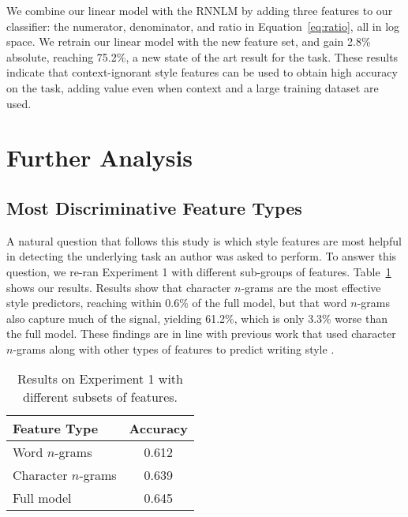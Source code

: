 \documentclass[11pt,a4paper]{article}
\newcommand{\tabref}[1]{Table~\ref{#1}}
\newcommand{\isection}[2]{\section{#1}\label{ssec:#2}}
\newcommand{\com}[1]{}
\newcommand{\resolved}[1]{}
\newcommand{\roy}[1]{{\color{orange}\textsc{[#1 --rs]}}}
\newcommand{\nascomment}[1]{{\color{blue}\textsc{[#1 --nas]}}}
\renewcommand{\roy}[1]{{\color{orange}[#1 --rs]}}
\renewcommand{\roy}[1]{#1}
\renewcommand{\nascomment}[1]{}
\begin{document}
We combine our linear model with the RNNLM by adding three features to
our classifier: the numerator, denominator, and ratio in
Equation~\ref{eq:ratio}, all in log space. %
We retrain our linear  model with the new feature set, and gain 2.8\%
absolute, reaching 75.2\%\com{ (15.3\% better than the published state of the art\com{ and 4.1\% better than the best unpublished} result)}\roy{, a new state of the art result for the task.}\resolved{\roy{As now the codalab shared task table contains our numbers, I removed the references to these works, and left only the footnote earlier which says that there are higher, unpublished numbers.}}
These results indicate that context-ignorant style features can be used to obtain high
accuracy on the task, adding value even when context and a large
training dataset are used.  \resolved{\nascomment{check reframing here}}




\isection{Further Analysis}{Ablation}

 \resolved{\nascomment{these aren't just ablations, so I retitled}}

\subsection{Most Discriminative Feature Types}
A natural question that follows this study is which style features are most
helpful in detecting the underlying task an author was asked
to perform. 
To answer this question, we re-ran Experiment 1 with different sub-groups of features. 
\tabref{subgroups} shows our results. Results show that  character $n$-grams are the most effective style predictors, reaching within  0.6\% of the full model, but that word $n$-grams also capture much of the signal, yielding 61.2\%, which is only 3.3\% worse than the full model. 
These findings are in line with previous work that used character $n$-grams along with other types of features to predict writing  style \cite{Schwartz:2013}.


\begin{table}[!t]
\begin{center}
\begin{tabular}{|l|c|} \hline
{\bf Feature Type} & {\bf Accuracy}\\ \hline
Word $n$-grams & 0.612 \\ \hline
Character $n$-grams & 0.639 \\ \hline
Full model & 0.645 \\ \hline

\end{tabular}
\end{center}
\caption{\label{subgroups}
Results on Experiment 1 with different subsets of features.
}
\end{table}
\end{document}
